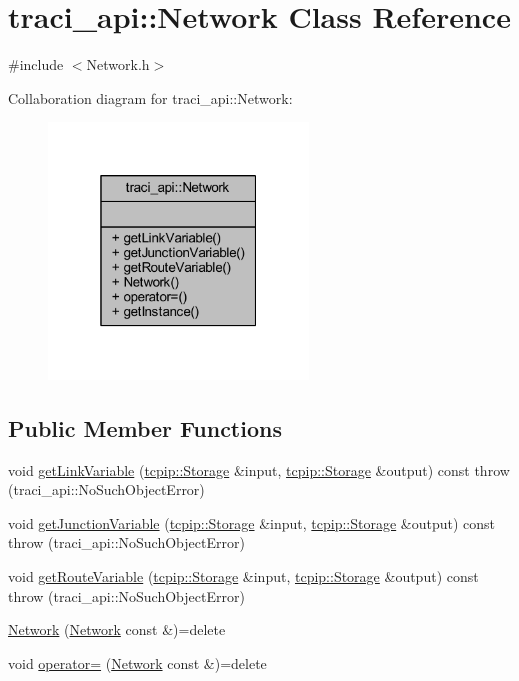 \hypertarget{classtraci__api_1_1_network}{}\section{traci\+\_\+api\+:\+:Network Class Reference}
\label{classtraci__api_1_1_network}


{\ttfamily \#include $<$Network.\+h$>$}



Collaboration diagram for traci\+\_\+api\+:\+:Network\+:
\nopagebreak
\begin{figure}[H]
\begin{center}
\leavevmode
\includegraphics[width=196pt]{classtraci__api_1_1_network__coll__graph}
\end{center}
\end{figure}
\subsection*{Public Member Functions}
\begin{DoxyCompactItemize}
\item 
void \hyperlink{classtraci__api_1_1_network_a8a82aa15b0422ce28ca240e88c1af4f7}{get\+Link\+Variable} (\hyperlink{classtcpip_1_1_storage}{tcpip\+::\+Storage} \&input, \hyperlink{classtcpip_1_1_storage}{tcpip\+::\+Storage} \&output) const  throw (traci\+\_\+api\+::\+No\+Such\+Object\+Error)
\item 
void \hyperlink{classtraci__api_1_1_network_a9bfe4236d1ab692d47133c69406811b3}{get\+Junction\+Variable} (\hyperlink{classtcpip_1_1_storage}{tcpip\+::\+Storage} \&input, \hyperlink{classtcpip_1_1_storage}{tcpip\+::\+Storage} \&output) const  throw (traci\+\_\+api\+::\+No\+Such\+Object\+Error)
\item 
void \hyperlink{classtraci__api_1_1_network_abc0574b41332ec15856e2e5bb9926be9}{get\+Route\+Variable} (\hyperlink{classtcpip_1_1_storage}{tcpip\+::\+Storage} \&input, \hyperlink{classtcpip_1_1_storage}{tcpip\+::\+Storage} \&output) const  throw (traci\+\_\+api\+::\+No\+Such\+Object\+Error)
\item 
\hyperlink{classtraci__api_1_1_network_a59991f6688c5c41ff4f3a5b9c941d952}{Network} (\hyperlink{classtraci__api_1_1_network}{Network} const \&)=delete
\item 
void \hyperlink{classtraci__api_1_1_network_ae6ac9267db1ace8c368a48a7b92ce964}{operator=} (\hyperlink{classtraci__api_1_1_network}{Network} const \&)=delete
\end{DoxyCompactItemize}
